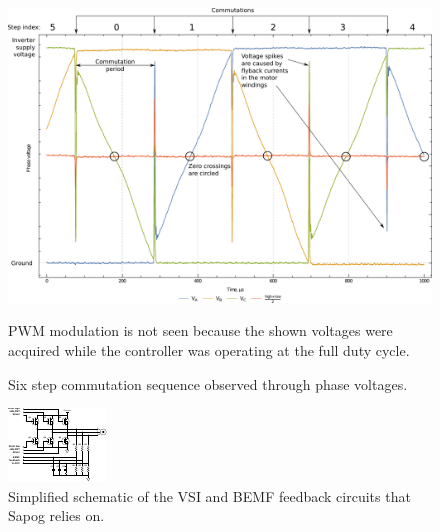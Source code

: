\documentclass{zubaxdoc}
\begin{document}
\begin{figure}[hbt]
    \centering
	\includegraphics[width=\textwidth]{commutation_basics}
	\caption{Six step commutation sequence observed through phase voltages.
	\label{commutation_basics}}
	PWM modulation is not seen because the shown voltages were acquired while the controller
	was operating at the full duty cycle.
\end{figure}

\begin{figure}[hbt]
    \centering
	\includegraphics[width=\textwidth]{power_stage_schematic}
	\caption{Simplified schematic of the VSI and BEMF feedback circuits that Sapog relies on.
	\label{power_stage_schematic}}
\end{figure}
\end{document}

